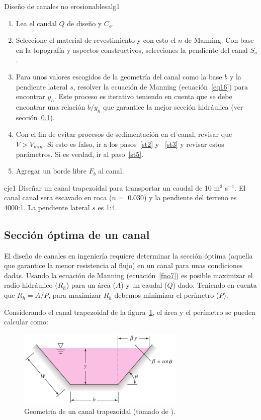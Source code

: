 \documentclass[11pt, oneside]{article}
\begin{document}
\begin{alg}{Diseño de canales no erosionables}{alg1}
\begin{enumerate}
\item Lea el caudal $Q$ de diseño y $C_o$.
\item \label{st2} Seleccione el material de revestimiento y con esto el $n$ de Manning. Con base en la topografía y aspectos constructivos, selecciones la pendiente del canal $S_o$.
\item \label{st3} Para unos valores escogidos de la geometría del canal como la base $b$ y la pendiente lateral $s$, resolver la ecuaci\'on de Manning (ecuaci\'on~\ref{eq16}) para encontrar $y_n$. Este proceso es iterativo teniendo en cuenta que se debe encontrar una relaci\'on $b/ y_n$ que garantice la mejor secci\'on hidráulica (ver secci\'on~\ref{secop}).
\item Con el fin de evitar procesos de sedimentaci\'on en el canal, revisar que $V > V_{min}$. Si esto es falso, ir a los pasos~\ref{st2} y ~\ref{st3} y revisar estos parámetros. Si es verdad, ir al paso~\ref{st5}. 
\item \label{st5} Agregar un borde libre $F_b$ al canal.
\end{enumerate}
\end{alg}

\begin{eje}{}{eje1}
Diseñar un canal trapezoidal para transportar un caudal de 10 m$^3$ s$^{-1}$. El canal canal sera escavado en roca ($n=$ 0.030) y la pendiente del terreno es 4000:1. La pendiente lateral $s$ es 1:4. 
\end{eje}


\subsection{Secci\'on \'optima de un canal}\label{secop}
El dise\~no de canales en ingenier\'ia requiere determinar la secci\'on \'optima (aquella que garantice la menor resistencia al flujo) en un canal para unas condiciones dadas. Usando la ecuaci\'on de Manning (ecuaci\'on~\ref{fno7}) es posible maximizar el radio hidr\'aulico ($R_h$) para un \'area ($A$) y un caudal ($Q$) dado. Teniendo en cuenta que $R_h = A/P$, para maximizar $R_h$ debemos minimizar el per\'imetro ($P$). 

Considerando el canal trapezoidal de la figura~\ref{fnor6}, el área y el perímetro se pueden calcular como:
\begin{figure}[h!]
\centering
\includegraphics[width=8cm]{fnor6.png}
\caption{Geometría de un canal trapezoidal (tomado de \cite{white1990fluid}).}
\label{fnor6}
\end{figure}
\end{document}
